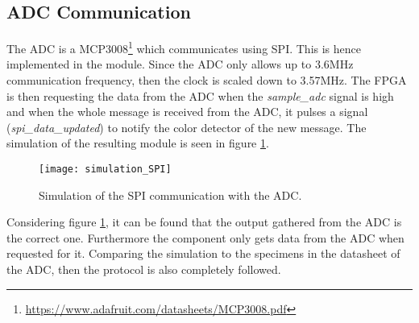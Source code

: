 
\subsection{ADC Communication}
The ADC is a MCP3008\footnote{ \url{https://www.adafruit.com/datasheets/MCP3008.pdf} } which communicates using SPI.
This is hence implemented in the module.
Since the ADC only allows up to 3.6MHz communication frequency, then the clock is scaled down to 3.57MHz.
The FPGA is then requesting the data from the ADC when the \textit{sample\_adc} signal is high and when the whole message is received from the ADC, it pulses a signal (\textit{spi\_data\_updated}) to notify the color detector of the new message.
The simulation of the resulting module is seen in figure \ref{fig:spi_simulation}.


\begin{figure}[H]
\centering
\texttt{[image: simulation\_SPI]}
\caption{Simulation of the SPI communication with the ADC.}
\label{fig:spi_simulation}
\end{figure}

Considering figure \ref{fig:spi_simulation}, it can be found that the output gathered from the ADC is the correct one.
Furthermore the component only gets data from the ADC when requested for it.
Comparing the simulation to the specimens in the datasheet of the ADC, then the protocol is also completely followed.